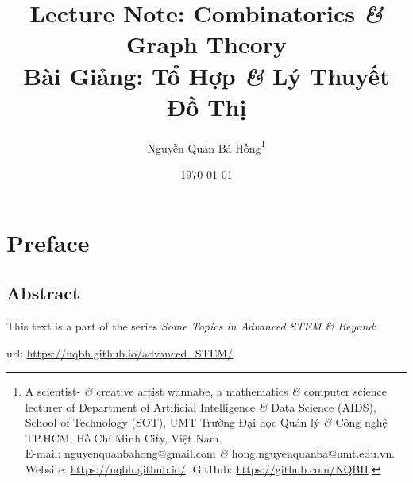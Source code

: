 \documentclass[oneside]{book}
\title{Lecture Note: Combinatorics {\it\&} Graph Theory\\Bài Giảng: Tổ Hợp {\it\&} Lý Thuyết Đồ Thị}
\author{Nguyễn Quản Bá Hồng\footnote{A scientist- {\it\&} creative artist wannabe, a mathematics {\it\&} computer science lecturer of Department of Artificial Intelligence {\it\&} Data Science (AIDS), School of Technology (SOT), UMT Trường Đại học Quản lý {\it\&} Công nghệ TP.HCM, Hồ Chí Minh City, Việt Nam.\\E-mail: {\sf nguyenquanbahong@gmail.com} {\it\&} {\sf hong.nguyenquanba@umt.edu.vn}. Website: \url{https://nqbh.github.io/}. GitHub: \url{https://github.com/NQBH}.}}
\date{\today}
\begin{document}
\maketitle
\setcounter{secnumdepth}{4}
\setcounter{tocdepth}{4}
\dominitoc %
\tableofcontents


\chapter*{Preface}

\section*{Abstract}
This text is a part of the series {\it Some Topics in Advanced STEM \& Beyond}:

{\sc url}: \url{https://nqbh.github.io/advanced_STEM/}.
\end{document}
